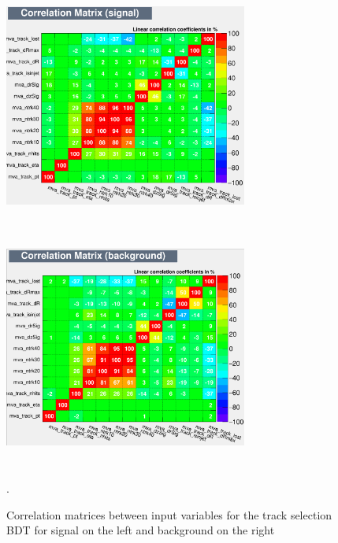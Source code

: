 \documentclass{cernatlasnote}
\begin{document}
\begin{figure}[ht]
\centering
\includegraphics[height=8cm, width=8cm, trim= 0cm 0cm 0cm 0cm,clip]{images/TRKBDT/BDTDaniel_CORS.png}\includegraphics[height=8cm, width=8cm, trim= 0cm 0cm 0cm 0cm,clip]{images/TRKBDT/BDTDaniel_CORB.png}
\caption{\label{fig:TRKCOR} Correlation matrices between input variables for the track selection BDT for signal on the left and background on the right}.
\end{figure} 
\end{document}
